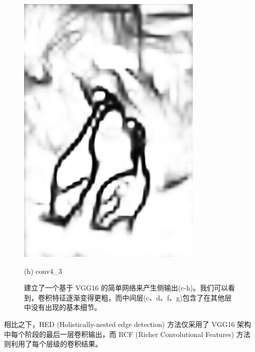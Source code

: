 \documentclass[CJK,aspectratio=169]{beamer}  %
\begin{document}
\begin{frame}
\begin{figure}
\begin{minipage}{0.11\columnwidth}
				\includegraphics[width=\linewidth]{picture/LLIE/RCF/conv4_3}
				\caption*{\tiny (h) conv4\_3}
				\label{fig: conv4_3}	
			\end{minipage}
			\caption{
				 建立了一个基于 VGG16\cite{simonyan2014very} 的简单网络来产生侧输出(c-h)。我们可以看到，卷积特征逐渐变得更粗，而中间层(c、d、f、g)包含了在其他层中没有出现的基本细节。
			}
		\end{figure}
		
		{ \yahei 相比之下，HED (Holistically-nested edge detection) \textcolor{blue}{\cite{xie2015holistically}}方法仅采用了 VGG16 架构中每个阶段的最后一层卷积输出，而 RCF (Richer Convolutional Features) 方法则利用了每个层级的卷积结果。}
		
	\end{frame}
	
\end{document}
